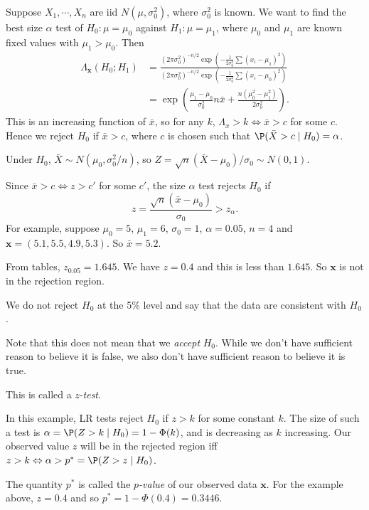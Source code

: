 \documentclass[a4paper]{article}
\begin{document}
\begin{eg}
  Suppose $X_1, \cdots, X_n$ are iid $N(\mu, \sigma_0^2)$, where $\sigma_0^2$ is known. We want to find the best size $\alpha$ test of $H_0: \mu = \mu_0$ against $H_1: \mu = \mu_1$, where $\mu_0$ and $\mu_1$ are known fixed values with $\mu_1 > \mu_0$. Then
  \begin{align*}
    \Lambda_\mathbf{x}(H_0; H_1) &= \frac{(2\pi\sigma_0^2)^{-n/2}\exp\left(-\frac{1}{2\sigma^2_0}\sum(x_i - \mu_1)^2\right)}{(2\pi\sigma_0^2)^{-n/2}\exp\left(-\frac{1}{2\sigma^2_0}\sum(x_i - \mu_0)^2\right)}\\
    &= \exp\left(\frac{\mu_1 - \mu_0}{\sigma_0^2}n\bar x + \frac{n(\mu_0^2 - \mu_1^2)}{2\sigma_0^2}\right).
  \end{align*}
  This is an increasing function of $\bar x$, so for any $k$, $\Lambda_x > k\Leftrightarrow \bar x > c$ for some $c$. Hence we reject $H_0$ if $\bar x > c$, where $c$ is chosen such that $\P(\bar X > c \mid H_0) = \alpha$.

  Under $H_0$, $\bar X \sim N(\mu_0, \sigma_0^2/n)$, so $Z = \sqrt{n}(\bar X - \mu_0)/\sigma_0 \sim N(0, 1)$.

  Since $\bar x > c\Leftrightarrow z > c'$ for some $c'$, the size $\alpha$ test rejects $H_0$ if
  \[
    z = \frac{\sqrt{n}(\bar x - \mu_0)}{\sigma_0} > z_\alpha.
  \]
  For example, suppose $\mu_0 = 5$, $\mu_1 = 6$, $\sigma_0 = 1$, $\alpha = 0.05$, $n = 4$ and $\mathbf{x} = (5.1, 5.5, 4.9, 5.3)$. So $\bar x = 5.2$.

  From tables, $z_{0.05} = 1.645$. We have $z = 0.4$ and this is less than $1.645$. So $\mathbf{x}$ is not in the rejection region.

  We do not reject $H_0$ at the 5\% level and say that the data are consistent with $H_0$.

  Note that this does not mean that we \emph{accept} $H_0$. While we don't have sufficient reason to believe it is false, we also don't have sufficient reason to believe it is true.

  This is called a $z$-\emph{test}.
\end{eg}

In this example, LR tests reject $H_0$ if $z > k$ for some constant $k$. The size of such a test is $\alpha = \P(Z > k\mid H_0) = 1 - \Phi(k)$, and is decreasing as $k$ increasing.
Our observed value $z$ will be in the rejected region iff $z > k \Leftrightarrow \alpha > p^* = \P(Z > z\mid H_0)$.
\begin{defi}[$p$-value]
  The quantity $p^*$ is called the \emph{$p$-value} of our observed data $\mathbf{x}$. For the example above, $z = 0.4$ and so $p^* = 1 - \Phi(0.4) = 0.3446$.
\end{defi}
\end{document}
